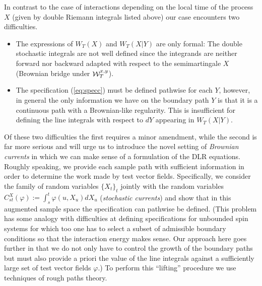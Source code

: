 \documentclass[a4paper,11pt]{article}
\newcommand{\W}{\mathop{\mathrm{{\cal W}}}\nolimits}
\begin{document}
In contrast to the case of interactions depending on the local time 
of the process $X$ (given by double Riemann integrals listed above) 
our case encounters two difficulties.
\begin{itemize}
\item[(1)]  
The expressions of $W_T(X)$ and $W_T(X|Y)$ are only formal: 
The double stochastic integrals are not well defined since the 
integrands are neither forward nor backward adapted with respect 
to the semimartingale $X$ (Brownian bridge under $\W^{x,y}_T$).
\item[(2)]  
The specification (\ref{eq:specc}) must be defined pathwise for each 
$Y$, however, in general the only information we have on the boundary 
path $Y$ is that it is a continuous path with a Brownian-like
regularity. This is insufficient for defining the line integrals with 
respect to $dY$ appearing in $W_T(X|Y)$.
\end{itemize}

\noindent
Of these two difficulties the first requires a minor amendment, 
while the second is far more serious and will urge us to introduce 
the novel setting of \emph{Brownian currents} in which we can make
sense of a formulation of the DLR equations. Roughly speaking, we 
provide each sample path with sufficient information in order to 
determine the work made by test vector fields. Specifically, we 
consider the family of random variables $\{X_t\}_t$ jointly with 
the random variables 
$
 C_{st}^X( \varphi) := \int_s^t \varphi(u,X_u) dX_u  
$
(\emph{stochastic currents})
and show that in this augmented sample space the specification can 
pathwise be defined. (This problem has some analogy with difficulties 
at defining specifications for unbounded spin systems for which too 
one has to select a subset of admissible boundary conditions so that 
the interaction energy makes sense. Our approach here goes further in 
that we do not only have to control the growth of the boundary paths 
but must also provide a priori the value of the line integrals against 
a sufficiently large set of test vector fields $\varphi$.) To perform 
this ``lifting'' procedure we use techniques of rough paths theory. 
\end{document}
